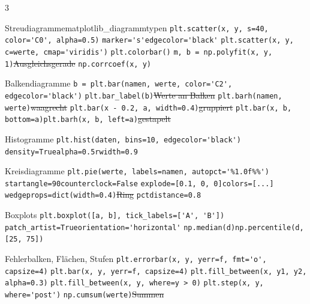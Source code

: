 \documentclass[9pt,a4paper,landscape]{extarticle}
\begin{document}
\begin{multicols*}{3}
\begin{merkblock}[2 Diagrammtypen]{Streudiagramme}{matplotlib\_diagrammtypen}
\lstinline!plt.scatter(x, y, s=40, color='C0', alpha=0.5)!\zl
\lstinline!marker='s'!\quad\lstinline!edgecolor='black'!\zl
\lstinline!plt.scatter(x, y, c=werte, cmap='viridis')!\zl
\lstinline!plt.colorbar()!\zl
\lstinline!m, b = np.polyfit(x, y, 1)!\st{Ausgleichsgerade}
\lstinline!np.corrcoef(x, y)!\zl
\end{merkblock}

\begin{merkblock}{Balkendiagramme}{}
\lstinline!b = plt.bar(namen, werte, color='C2', edgecolor='black')!\zl
\lstinline!plt.bar_label(b)!\st{Werte an Balken}
\lstinline!plt.barh(namen, werte)!\st{waagrecht}
\lstinline!plt.bar(x - 0.2, a, width=0.4)!\st{gruppiert}
\lstinline!plt.bar(x, b, bottom=a)!\quad\lstinline!plt.barh(x, b, left=a)!\st{gestapelt}
\end{merkblock}

\begin{merkblock}{Histogramme}{}
\lstinline!plt.hist(daten, bins=10, edgecolor='black')!\zl
\lstinline!density=True!\quad\lstinline!alpha=0.5!\quad\lstinline!rwidth=0.9!\zl
\end{merkblock}

\begin{merkblock}{Kreisdiagramme}{}
\lstinline!plt.pie(werte, labels=namen, autopct='%1.0f%%')!\zl
\lstinline!startangle=90!\quad\lstinline!counterclock=False!\zl
\lstinline!explode=[0.1, 0, 0]!\quad\lstinline!colors=[...]!\zl
\lstinline!wedgeprops=dict(width=0.4)!\st{Ring}
\lstinline!pctdistance=0.8!\zl
\end{merkblock}

\begin{merkblock}{Boxplots}{}
\lstinline!plt.boxplot([a, b], tick_labels=['A', 'B'])!\zl
\lstinline!patch_artist=True!\quad\lstinline!orientation='horizontal'!\zl
\lstinline!np.median(d)!\quad\lstinline!np.percentile(d, [25, 75])!\zl
\end{merkblock}

\begin{merkblock}{Fehlerbalken, Flächen, Stufen}{}
\lstinline!plt.errorbar(x, y, yerr=f, fmt='o', capsize=4)!\zl
\lstinline!plt.bar(x, y, yerr=f, capsize=4)!\zl
\lstinline!plt.fill_between(x, y1, y2, alpha=0.3)!\zl
\lstinline!plt.fill_between(x, y, where=y > 0)!\zl
\lstinline!plt.step(x, y, where='post')!\zl
\lstinline!np.cumsum(werte)!\st{Summen}
\end{merkblock}


\end{multicols*}
\end{document}
